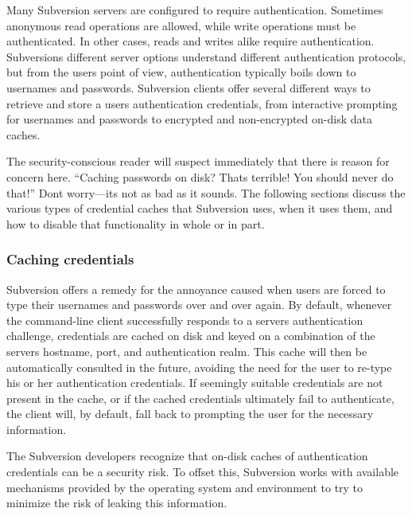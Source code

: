 Many Subversion servers are configured to require authentication.
Sometimes anonymous read operations are allowed, while write operations
must be authenticated. In other cases, reads and writes alike require
authentication. Subversion\textquotesingle s different server options
understand different authentication protocols, but from the
user\textquotesingle s point of view, authentication typically boils
down to usernames and passwords. Subversion clients offer several
different ways to retrieve and store a user\textquotesingle s
authentication credentials, from interactive prompting for usernames and
passwords to encrypted and non-encrypted on-disk data caches.

The security-conscious reader will suspect immediately that there is
reason for concern here. ``Caching passwords on disk?
That\textquotesingle s terrible! You should never do that!''
Don\textquotesingle t worry---it\textquotesingle s not as bad as it
sounds. The following sections discuss the various types of credential
caches that Subversion uses, when it uses them, and how to disable that
functionality in whole or in part.

\subsubsection{Caching
credentials}\label{svn.serverconfig.netmodel.credcache}

Subversion offers a remedy for the annoyance caused when users are
forced to type their usernames and passwords over and over again. By
default, whenever the command-line client successfully responds to a
server\textquotesingle s authentication challenge, credentials are
cached on disk and keyed on a combination of the
server\textquotesingle s hostname, port, and authentication realm. This
cache will then be automatically consulted in the future, avoiding the
need for the user to re-type his or her authentication credentials. If
seemingly suitable credentials are not present in the cache, or if the
cached credentials ultimately fail to authenticate, the client will, by
default, fall back to prompting the user for the necessary information.

The Subversion developers recognize that on-disk caches of
authentication credentials can be a security risk. To offset this,
Subversion works with available mechanisms provided by the operating
system and environment to try to minimize the risk of leaking this
information.

